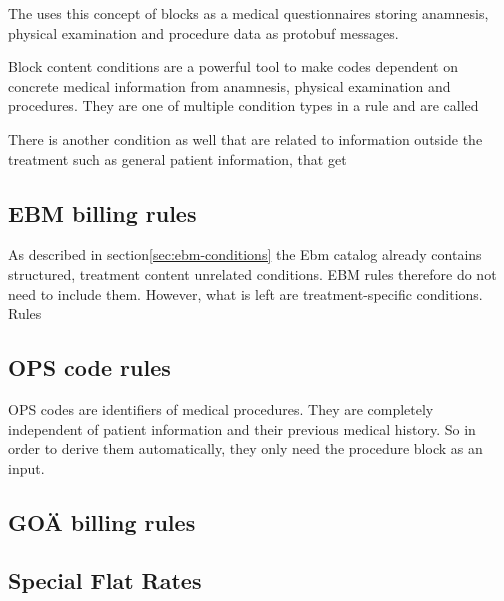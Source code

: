 The \AVS uses this concept of blocks as a medical questionnaires storing anamnesis, physical examination and procedure
data as protobuf messages.

Block content conditions are a powerful tool to make codes dependent on concrete medical information from anamnesis,
physical examination and procedures.
They are one of multiple condition types in a rule and are called 


There is another condition
as well that are related to information outside the treatment such as general patient information,
that get

\subsection{EBM billing rules}\label{subsec:ebm-billing-rules}
As described in section\ref{sec:ebm-conditions} the Ebm catalog already contains structured,
treatment content unrelated conditions.
EBM rules therefore do not need to include them.
However, what is left are treatment-specific conditions.
Rules

\subsection{OPS code rules}\label{subsec:ops-code-rules}
OPS codes are identifiers of medical procedures.
They are completely independent of patient information and their previous medical history.
So in order to derive them automatically, they only need the procedure block as an input.

\subsection{GOÄ billing rules}\label{subsec:goa-billing-rules}


\subsection{Special Flat Rates}\label{subsec:special-flat-rates}

